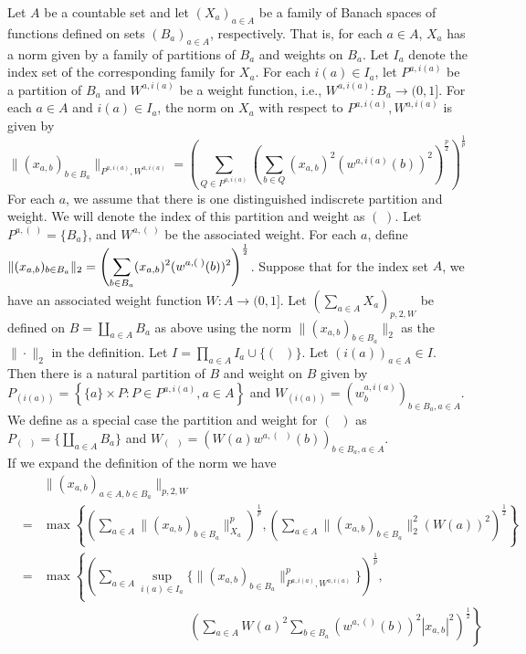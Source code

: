 \documentclass[12pt]{amsart}
\theoremstyle{definition}
\theoremstyle{remark}
\numberwithin{equation}{section}
\begin{document}
Let $A$ be a countable set and let $(X_a)_{a\in A}$ be a 
family of Banach spaces of functions defined on sets $(B_a)_{a\in A}$,
respectively. That is, for each $a\in A$, $X_a$ has a norm given by
a family of partitions of $B_a$ and weights on $B_a$. Let $I_a$ denote the
index set of the corresponding family for $X_a$. For each $i(a)\in
I_a$, let $P^{a, i(a)}$ be a partition of $B_a$
and $W^{a, i(a)}$ be a weight function, i.e.,
$W^{a, i(a)}: B_a \rightarrow (0, 1]$. For each $a\in A$ and $i(a)\in
I_a$, the norm on $X_a$
with respect to $P^{a, i(a)}, W^{a, i(a)}$ is given by
$$\|(x_{a,b})_{b\in B_a}\|_{P^{a,i(a)},
 W^{a,i(a)}} =\left ( \sum_{Q \in P^{a, i(a)}} \left(\sum_{b \in Q }
 (x_{a,b})^2(w^{a,i(a)}(b))^2\right)^{\frac{p}{2}}\right )^{\frac{1}{p}}
$$
For each $a$, we assume that there is one distinguished indiscrete partition
and weight. We will denote the index of this partition and weight as $(\;)$.
Let $P^{a,(\;)} = \{ B_a \}$, and $W^{a,(\;)}$ be the associated weight.
For each $a$, define
$\begin{displaystyle} \label{2 norm} %
\|(x_{a,b})_{b\in B_a}\|_2 
= \left(\sum_{b \in B_a } (x_{a,b})^2(w^{a,(\;)}(b))^2\right)^{\frac{1}{2}} 
\end{displaystyle}$.
Suppose that for the index set $A$, we have an associated weight function
$W: A\rightarrow (0, 1]$.
Let $(\sum_{a\in A} X_a)_{p,2,W} $
be defined on $B= {\coprod}_{a\in A} B_a$ as above using the norm
$\|(x_{a,b})_{b\in B_a}\|_2 $
as the $\|\cdot\|_2$ in the definition.
Let $I = {\prod}_{a\in A} I_a \cup \{(\phantom{x})\}$. Let
$(i(a))_{a\in A} \in I$.
Then there is a natural partition of $B$ and weight on $B$ given by
$P_{(i(a))}=\left\{\{a\}\times P : P \in P^{a, i(a)}, a\in A\right \}$  and 
$W_{(i(a))}=(w_{b}^{a,i(a)})_{b\in B_a, a\in A}$.
We define as a special case the partition and weight for $(\phantom{x}
 )$ as
 $P_{(\phantom{x} )}=\{  {\coprod}_{a\in A} B_a\}$ and
 $W_{(\phantom{x} )}=(W(a)w^{a, (\phantom{x} )}(b))_{b\in B_a, a \in A}$.\\
If we expand the definition of the norm we have
\begin{eqnarray}
&&\|(x_{a,b})_{a\in A, b\in B_a}\|_{p,2,W}\nonumber\\
&=&\max \left \{ \left(\sum_{a\in A} \|(x_{a,b})_{b\in
  B_a}\|_{X_a}^{p}\right)^{\frac{1}{p}},
 \left(\sum_{a\in A} \|(x_{a,b})_{b\in B_a}\|_{2}^{2}
(W(a))^2\right)^{\frac{1}{2}}\right \}\nonumber\\
&=&\max \left \{ \left(\sum_{a\in A} \sup_{i(a)\in I_a}
 \{\|(x_{a,b})_{b\in B_a}\|_{P^{a,i(a)}, 
W^{a, i(a)}}^{p}\}\right)^{\frac{1}{p}},\right .\nonumber\\
&&\phantom{xxxxxxxxxxxxxxxxxxxx}\left .\left(\sum_{a\in A} 
W(a)^2\sum_{b\in B_a}
(w^{a, ( )}(b))^2 |x_{a,b}|^2\right)^{\frac{1}{2}}\right \}\label{p,2,W-sum}
\end{eqnarray}
\end{document}
